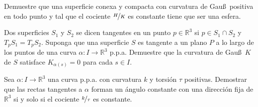 \documentclass[12pt]{article}
\begin{document}
    \begin{ejercicio}[2.5 puntos]
        Demuestre que una superficie conexa y compacta con curvatura de Gau\ss\ positiva en todo punto y tal que el cociente $\nicefrac{H}{K}$ es constante tiene que ser una esfera.
    \end{ejercicio}

    \begin{ejercicio}[2.5 puntos]
        Dos superficies $S_1$ y $S_2$ se dicen tangentes en un punto $p\in \mathbb{R}^3$ si $p\in S_1\cap S_2$ y $T_pS_1 = T_pS_2$. Suponga que una superficie $S$ es tangente a un plano $P$ a lo largo de los puntos de una curva $\alpha:I\to\mathbb{R}^3$ p.p.a. Demuestre que la curvatura de Gau\ss\ $K$ de $S$ satisface $K_{\alpha(s)} = 0$ para cada $s\in I$.
    \end{ejercicio}

    \begin{ejercicio}[2.5 puntos]
        Sea $\alpha:I\to\mathbb{R}^3$ una curva p.p.a. con curvatura $k$ y torsión $\tau$ positivas. Demostrar que las rectas tangentes a $\alpha$ forman un ángulo constante con una dirección fija de $\mathbb{R}^3$ si y solo si el cociente $\nicefrac{k}{\tau}$ es constante.
    \end{ejercicio}
\end{document}

